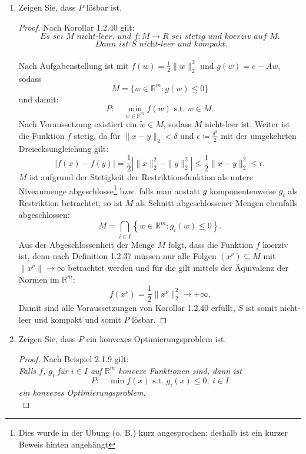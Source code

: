 \documentclass[12pt]{extreport} %
\newcommand{\R}{\mathbb{R}}
\theoremstyle{named}
\theoremstyle{nnamed}
\theoremstyle{itshape}
\theoremstyle{normal}
\begin{document}
\begin{enumerate}
	\item Zeigen Sie, dass $P$ lösbar ist.
		\begin{proof}
			Nach Korollar 1.2.40 gilt:
				$$ \textit{Es sei } M \textit{ nicht-leer, und } f \colon M \rightarrow R \textit{ sei stetig und koerziv auf } M. $$
				$$ \textit{ Dann ist } S \textit{ nicht-leer und kompakt.} $$ ~\\
			Nach Aufgabenstellung ist mit $f(w) = \frac{1}{2} \| w \|_2^2$ und $g(w) = e - Aw$, sodass 
				$$ M = \{ w \in \R^m \colon  g(w) \leq 0 \} $$ 
			und damit:
				$$ P: \quad \min_{w \in \R^m} f(w) \text{ s.t. } w \in M. $$
			Nach Voraussetzung existiert ein $\tilde{w} \in M$, sodass $M$ nicht-leer ist. Weiter ist die Funktion $f$ stetig, da für $\| x - y \|_2 < \delta$ und $\epsilon \coloneqq \frac{\delta^2}{2}$ mit der umgekehrten Dreiecksungleichung gilt:	
			$$ \left| f(x) - f(y) \right| = \frac{1}{2} \left| \| x \|^2_2 - \| y \|_2^2 \right| \leq \frac{1}{2} \| x - y \|_2^2 \leq \epsilon. $$
			$M$ ist aufgrund der Stetigkeit der Restriktionsfunktion als untere Niveaumenge abgeschlosse\footnote{Dies wurde in der Übung (o. B.) kurz angesprochen; deshalb ist ein kurzer Beweis hinten angehängt} bzw. falls man anstatt $g$ komponentenweise $g_i$ als Restriktion betrachtet, so ist $M$ als Schnitt abgeschlossener Mengen ebenfalls abgeschlossen:
			$$ M = \bigcap_{i \in I } \left\{ w \in \R^m \colon g_i(w) \leq 0 \right\}. $$
			 Aus der Abgeschlossenheit der Menge $M$ folgt, dass die Funktion $f$ koerziv ist, denn nach Definition 1.2.37 müssen nur alle Folgen $(x^\nu) \subseteq M$ mit $\| x^\nu \| \rightarrow \infty$ betrachtet werden und für die gilt mittels der Äquivalenz der Normen im $\R^m$:
			$$ f(x^\nu) = \frac{1}{2} \| x^\nu \|_2^2 \longrightarrow +\infty. $$
			Damit sind alle Voraussetzungen von Korollar 1.2.40 erfüllt, $S$ ist somit nicht-leer und kompakt und somit $P$ lösbar.
		\end{proof}
	\item Zeigen Sie, dass $P$ ein konvexes Optimierungsproblem ist.
		\begin{proof}
		Nach Beispiel 2.1.9 gilt: ~\\
			\textit{Falls $f$, $g_i$ für $i \in I$ auf $\R^m$ konvexe Funktionen sind, dann ist}
			$$P: \quad \min f(x) \text{ s.t. } g_i (x) \leq 0, ~ i \in I $$
			\textit{ein konvexes Optimierungsproblem.} ~\\
			

\end{proof}
\end{enumerate}
\end{document}
